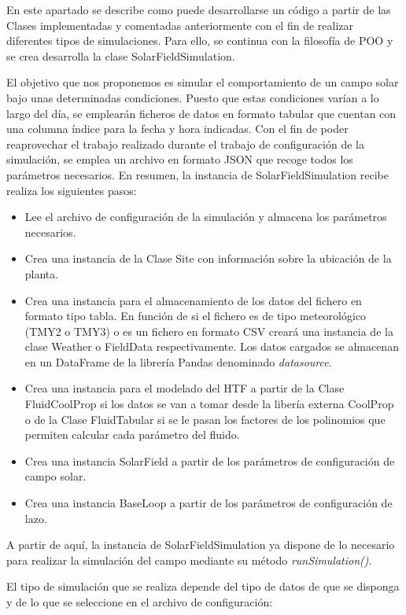 \documentclass[12pt]{report} %
\begin{document}
En este apartado se describe como puede desarrollarse un código a partir de las Clases implementadas y comentadas anteriormente con el fin de realizar diferentes tipos de simulaciones. Para ello, se continua con la filosofía de POO y se crea desarrolla la clase SolarFieldSimulation.

El objetivo que nos proponemos es simular el comportamiento de un campo solar bajo unas determinadas condiciones. Puesto que estas condiciones varían a lo largo del día, se emplearán ficheros de datos en formato tabular que cuentan con una columna índice para la fecha y hora indicadas. Con el fin de poder reaprovechar el trabajo realizado durante el trabajo de configuración de la simulación, se emplea un archivo en formato JSON que recoge todos los parámetros necesarios. En resumen, la instancia de SolarFieldSimulation recibe realiza los siguientes pasos:

\begin{itemize}
\item
  Lee el archivo de configuración de la simulación y almacena los   parámetros necesarios.
\item
  Crea una instancia de la Clase Site con información sobre la ubicación   de la planta.
\item
  Crea una instancia para el almacenamiento de los datos del fichero en   formato tipo tabla. En función de si el fichero es de tipo   meteorológico (TMY2 o TMY3) o es un fichero en formato CSV creará una   instancia de la clase Weather o FieldData respectivamente. Los datos   cargados se almacenan en un DataFrame de la librería Pandas denominado  \emph{datasource}.
\item
  Crea una instancia para el modelado del HTF a partir de la Clase   FluidCoolProp si los datos se van a tomar desde la libería externa   CoolProp o de la Clase FluidTabular si se le pasan los factores de los   polinomios que permiten calcular cada parámetro del fluido.
\item
  Crea una instancia SolarField a partir de los parámetros de   configuración de campo solar.
\item
  Crea una instancia BaseLoop a partir de los parámetros de   configuración de lazo.
\end{itemize}

A partir de aquí, la instancia de SolarFieldSimulation ya dispone de lo necesario para realizar la simulación del campo mediante su método \emph{runSimulation()}.

El tipo de simulación que se realiza depende del tipo de datos de que se disponga y de lo que se seleccione en el archivo de configuración:
\end{document}
